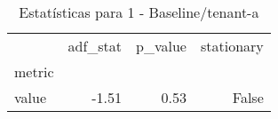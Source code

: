 \begin{table}[htbp]
\caption{Estatísticas para 1 - Baseline/tenant-a}
\label{tab:1_-_baseline_tenant-a_adf_test}
\begin{tabular}{lrrr}
\toprule
 & adf_stat & p_value & stationary \\
metric &  &  &  \\
\midrule
value & -1.51 & 0.53 & False \\
\bottomrule
\end{tabular}
\end{table}

